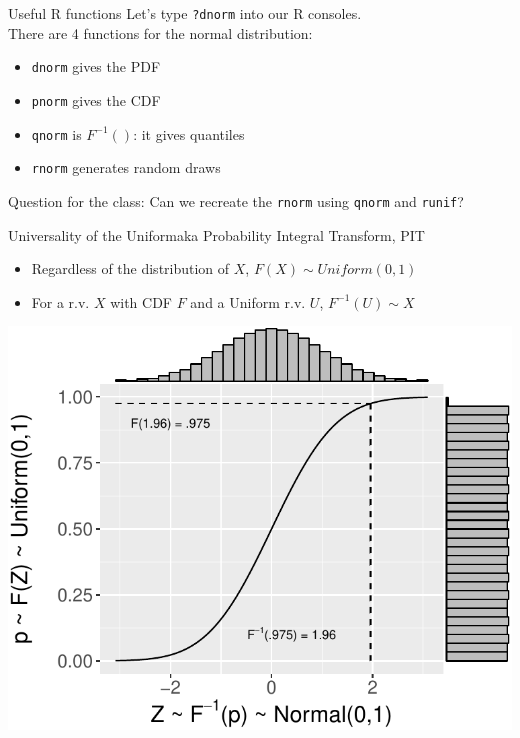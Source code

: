 \documentclass{beamer}
\begin{document}
\begin{frame}{Useful R functions}
Let's type \texttt{?dnorm} into our R consoles. \pause \\
There are 4 functions for the normal distribution:
\begin{itemize}
\item \texttt{dnorm} gives the PDF
\item \texttt{pnorm} gives the CDF
\item \texttt{qnorm} is $F^{-1}()$: it gives quantiles
\item \texttt{rnorm} generates random draws
\end{itemize}
Question for the class: Can we recreate the \texttt{rnorm} using \texttt{qnorm} and \texttt{runif}?
\end{frame}

\begin{frame}{Universality of the Uniform}{aka Probability Integral Transform, PIT}
\begin{theorem}
\begin{footnotesize}
\begin{itemize}
\item Regardless of the distribution of $X$, $F(X)\sim Uniform(0,1)$
\item For a r.v. $X$ with CDF $F$ and a Uniform r.v. $U$, $F^{-1}(U)\sim X$
\end{itemize}
\end{footnotesize}
\end{theorem}
\begin{center}
\includegraphics[scale=.55]{figures/UofU.pdf}
\end{center}
\end{frame}
\end{document}
